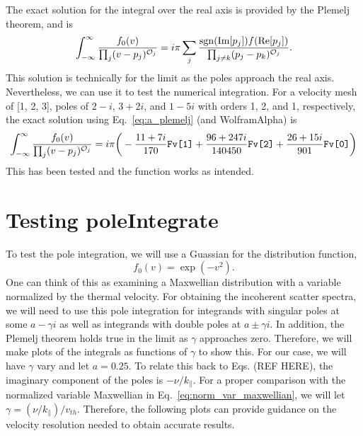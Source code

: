 The exact solution for the integral over the real axis is provided by the Plemelj theorem, %
and is 
\begin{equation}
	\int_{-\infty}^\infty \frac{f_0(v)}{\prod_j (v-p_j)^{\mathcal{O}_j}} = 
	i \pi \sum_j \frac{ \operatorname{sgn}(\operatorname{Im}[p_j]) f(\operatorname{Re}[p_j])}{ \prod_{j\neq k} (p_j - p_k)^{\mathcal{O}_j}}.
	\label{eq:a_plemelj}
\end{equation} 
This solution is technically for the limit as the poles approach the real axis. 
Nevertheless, we can use it to test the numerical integration.
For a velocity mesh of [1, 2, 3], 
poles of $2-i$, $3+2i$, and $1-5i$ with orders 
1, 2, and 1, respectively, the exact solution using Eq.~\ref{eq:a_plemelj} (and WolframAlpha) is
\begin{equation}
	\int_{-\infty}^\infty \frac{f_0(v)}{\prod_j (v-p_j)^{\mathcal{O}_j}} = 
	i \pi \bigg(-\frac{11+7i}{170} \verb|Fv[1]| + \frac{96+247i}{140450} \verb|Fv[2]|  + \frac{26+15i}{901} \verb|Fv[0]|  \bigg) 
\end{equation}
This has been tested and the function works as intended.


\section{Testing poleIntegrate}

To test the pole integration, we will use a Guassian for the distribution function,
\begin{equation}
	f_0(v) = \exp(-v^2). 
	\label{eq:norm_var_maxwellian}
\end{equation}
One can think of this as examining a Maxwellian distribution with a variable normalized by the thermal velocity.
For obtaining the incoherent scatter spectra, we will need to use this pole integration for integrands 
with singular poles at some $a-\gamma i$ as well as integrands with double poles at $a\pm \gamma i$.
In addition, the Plemelj theorem holds true in the limit as $\gamma$ approaches zero. 
Therefore, we will make plots of the integrals as functions of $\gamma$ to show this.
For our case, we will have $\gamma$ vary and let $a=0.25$. 
To relate this back to Eqs. (REF HERE), the imaginary component of the poles is $-\nu/k_\parallel$.
For a proper comparison with the normalized variable Maxwellian in Eq.~\ref{eq:norm_var_maxwellian},
we will let $\gamma = (\nu/k_\parallel)/v_{th}$. 
Therefore, the following plots can provide guidance on the velocity resolution needed to obtain accurate results.

